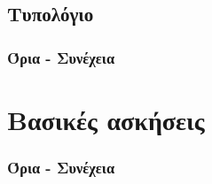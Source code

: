 \documentclass[a4paper,11pt,twoside]{article}
\newcommand{\myleftmark}{\leftmark}
\renewcommand{\myleftmark}{{\large Τυπολόγιο}}
\begin{document}
\newpage
\renewcommand{\myleftmark}{{\large Τυπολόγιο}}
\begin{center}
\part{Τυπολόγιο}
\end{center}
\section{Όρια - Συνέχεια}
\part{Βασικές ασκήσεις}
\section{Όρια - Συνέχεια}
\end{document}
